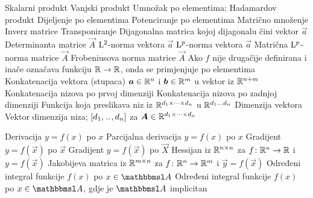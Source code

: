  {} 
	{Skalarni produkt}
	{Vanjski produkt}
	{Umnožak po elementima; Hadamardov produkt}
	{Dijeljenje po elementima}
	{Potenciranje po elementima}
	{Matrično množenje}
	{Inverz matrice}
	{Transponiranje}
	{Dijagonalna matrica kojoj dijagonalu čini vektor $\vec a$}
	{Determinanta matrice $\vec A$}
	{$\mathrm{L}^2$-norma vektora $\vec a$}
	{$\mathrm{L}^p$-norma vektora $\vec a$}
	{Matrična $\mathrm{L}^p$-norma matrice $\vec A$}
	{Frobeniusova norma matrice $\vec A$}
	{Ako $f$ nije drugačije definirana i inače označava funkciju $\mathbb{R}\to\mathbb{R}$, onda se primjenjuje po elementima}
	{Konkatenacija vektora (stupaca) $\vec a\in\R^n$ i $\vec b\in\R^m$ u vektor iz $\mathbb{R}^{n+m}$}
	{Konkatenacija nizova po prvoj dimenziji}
	{Konkatenacija nizova po zadnjoj dimenziji}
	{Funkcija koja preslikava niz iz $\mathbb{R}^{d_1\times\dots\times d_n}$ u $\mathbb{R}^{d_1\dots d_n}$}
	{Dimenzija vektora}
	{Vektor dimenzija niza; $\sbr{d_1,\bidot,d_n}$ za $\vec A\in\R^{d_1\times\dots\times d_n}$}

	{Derivacija $y=f(x)$ po $x$}
	{Parcijalna derivacija $y=f(x)$ po $x$}
	{Gradijent $y=f(\vec x)$ po $\vec x$}
	{Gradijent $y=f(\vec x)$ po $\vec X$}
	{Hessijan iz $\mathbb{R}^{n\times n}$ za $f \colon \mathbb{R}^n \to \mathbb{R}$ i $y=f(\vec x)$}
	{Jakobijeva matrica iz $\mathbb{R}^{m\times n}$ za $f \colon \mathbb{R}^n \to \mathbb{R}^m$ i $\vec y=f(\vec x)$}
	{Određeni integral funkcije $f(x)$ po $x\in\set A$}
	{Određeni integral funkcije $f(x)$ po $x\in\set A$, gdje je $\set A$ implicitan}

